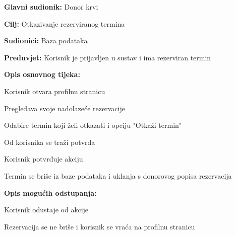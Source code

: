 				\noindent {}
				\begin{packed_item}
					
					\item \textbf{Glavni sudionik: }Donor krvi
					\item  \textbf{Cilj:} Otkazivanje rezerviranog termina
					\item  \textbf{Sudionici:} Baza podataka
					\item  \textbf{Preduvjet:} Korisnik je prijavljen u sustav i ima rezerviran termin
					\item  \textbf{Opis osnovnog tijeka:}
					
					\item[] \begin{packed_enum}
						
						\item Korisnik otvara profilnu stranicu
						\item Pregledava svoje nadolazeće rezervacije
						\item Odabire termin koji želi otkazati i opciju "Otkaži termin"
						\item Od korisnika se traži potvrda
						\item Korisnik potvrđuje akciju
						\item Termin se briše iz baze podataka i uklanja s donorovog popisa rezervacija
					\end{packed_enum}
					
					\item  \textbf{Opis mogućih odstupanja:}
					
					\item[] \begin{packed_item}
						
						\item[5.a] Korisnik odustaje od akcije
						\item[] \begin{packed_enum}
							
							\item Rezervacija se ne briše i korisnik se vraća na profilnu stranicu
							
						\end{packed_enum}		
						
					\end{packed_item}
				\end{packed_item}
				

